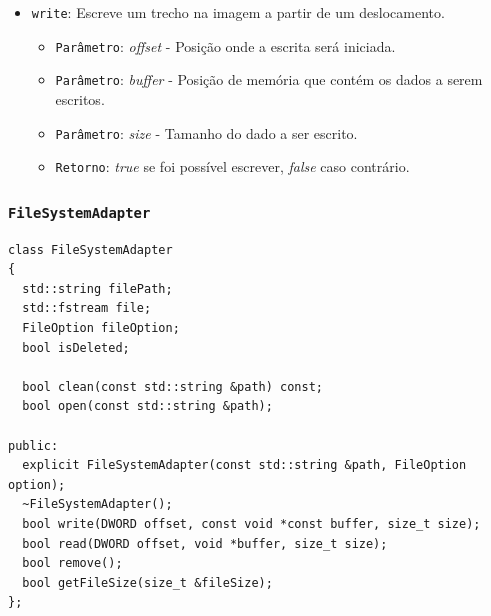 \documentclass[
    12pt,				%
    oneside,   	        %
    a4paper,			%
    english,			%
    french,				%
    spanish,			%
    brazil,				%
    ]{pacotes/abntex2}
\begin{document}
\begin{itemize}
\begin{itemize}
            \item \texttt{write}: Escreve um trecho na imagem a partir de um deslocamento.
            \begin{itemize}
                \item \texttt{Parâmetro}: \textit{offset} - Posição onde a escrita será iniciada.
                \item \texttt{Parâmetro}: \textit{buffer} - Posição de memória que contém os dados a serem escritos.
                \item \texttt{Parâmetro}: \textit{size} - Tamanho do dado a ser escrito.
                \item \texttt{Retorno}: \textit{true} se foi possível escrever, \textit{false} caso contrário.
            \end{itemize}
        \end{itemize}
\end{itemize}

\subsubsection{\texttt{FileSystemAdapter}}
\label{subsubsec:file_system_adapter}

\begin{lstlisting}[caption={Classe para manipulação de arquivos no sistema}, label={lst:filesystemadapter}]
class FileSystemAdapter
{
  std::string filePath;
  std::fstream file;
  FileOption fileOption;
  bool isDeleted;

  bool clean(const std::string &path) const;
  bool open(const std::string &path);

public:
  explicit FileSystemAdapter(const std::string &path, FileOption option);
  ~FileSystemAdapter();
  bool write(DWORD offset, const void *const buffer, size_t size);
  bool read(DWORD offset, void *buffer, size_t size);
  bool remove();
  bool getFileSize(size_t &fileSize);
};
\end{lstlisting}
\end{document}
